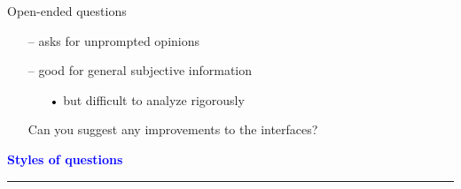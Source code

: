 \documentclass[pdf]{beamer}
\begin{document}
{{{{{\begin{frame}
    Open-ended questions
    \begin{itemize}
      \item[\textcolor{black}{--}] asks for unprompted opinions
      \item[\textcolor{black}{--}] good for general subjective information
       \begin{itemize}
      	\item[\textcolor{black}{•}] but difficult to analyze rigorously
        \end{itemize} 
        \vspace{10mm}
        Can you suggest any improvements to the interfaces?
        \vspace{40mm}
    \end{itemize}    
\end{frame}



{
\begin{frame}
	\vspace{8mm}
	\textcolor{Blue}{\textbf{\large{Styles of questions}}}
    \textcolor{red}{\rule{10cm}{1mm}}
    

\end{frame}}}}}}}
\end{document}
